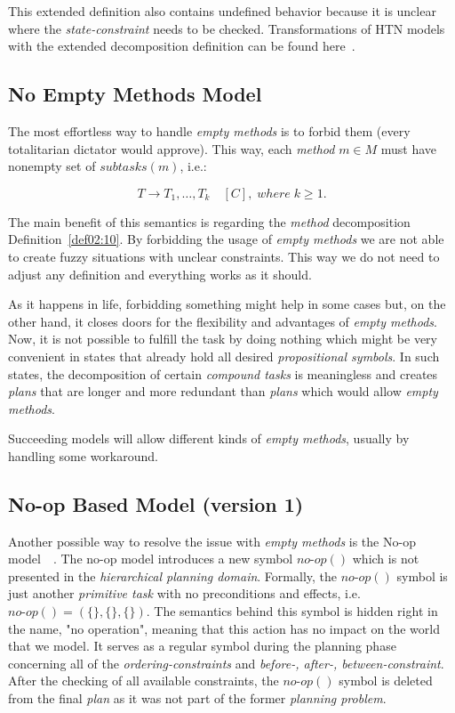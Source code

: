 This extended definition also contains undefined behavior because it is unclear where the \emph{state-constraint} needs to be checked. Transformations of HTN models with the extended decomposition definition can be found here~\cite{ondrckova2024empty}.

\subsection{No Empty Methods Model}\label{sub03:311}

\medskip\noindent
The most effortless way to handle \emph{empty methods} is to forbid them (every totalitarian dictator would approve). This way, each \emph{method} $m \in M$ must have nonempty set of $subtasks(m)$, i.e.:

\[
    T \rightarrow T_1,\dots,T_k \quad [C], \; where \; k \geq 1.
\]

\noindent
The main benefit of this semantics is regarding the \emph{method} decomposition Definition~\ref{def02:10}. By forbidding the usage of \emph{empty methods} we are not able to create fuzzy situations with unclear constraints. This way we do not need to adjust any definition and everything works as it should.

\medskip\noindent
As it happens in life, forbidding something might help in some cases but, on the other hand, it closes doors for the flexibility and advantages of \emph{empty methods}. Now, it is not possible to fulfill the task by doing nothing which might be very convenient in states that already hold all desired \emph{propositional symbols}. In such states, the decomposition of certain \emph{compound tasks} is meaningless and creates \emph{plans} that are longer and more redundant than \emph{plans} which would allow \emph{empty methods}.

\medskip\noindent
Succeeding models will allow different kinds of \emph{empty methods}, usually by handling some workaround.

\subsection{No-op Based Model (version 1)}

\medskip\noindent
Another possible way to resolve the issue with \emph{empty methods} is the No-op model~\cite{ondrckova2023semantics}~\cite{ondrckova2024empty}. The no-op model introduces a new symbol $no\text{-}op()$ which is not presented in the \emph{hierarchical planning domain}. Formally, the $no\text{-}op()$ symbol is just another \emph{primitive task} with no preconditions and effects, i.e. $no\text{-}op() = (\{\}, \{\}, \{\})$. The semantics behind this symbol is hidden right in the name, "no operation", meaning that this action has no impact on the world that we model. It serves as a regular symbol during the planning phase concerning all of the \emph{ordering-constraints} and \emph{before-, after-, between-constraint}. After the checking of all available constraints, the $no\text{-}op()$ symbol is deleted from the final \emph{plan} as it was not part of the former \emph{planning problem}.

